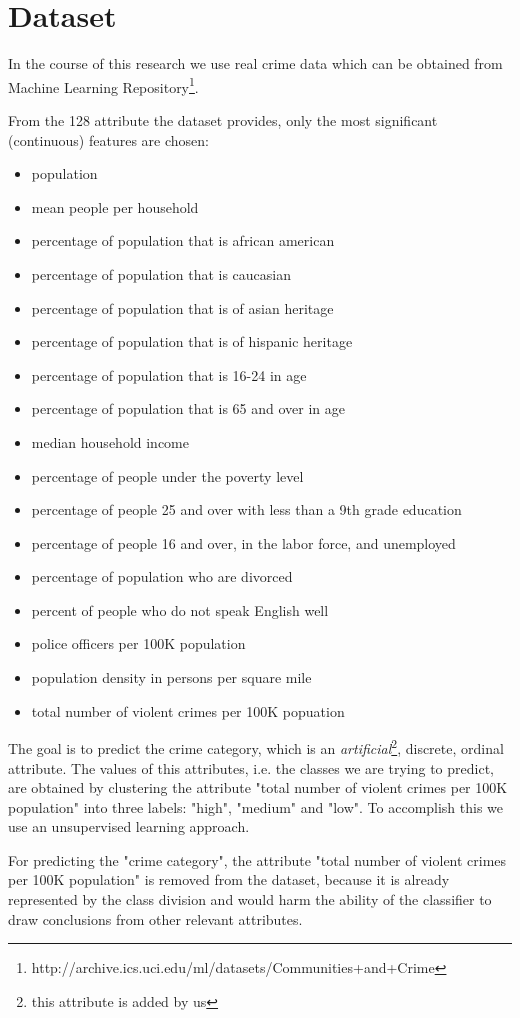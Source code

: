 \section{Dataset}

In the course of this research we use real crime data which can be obtained from Machine Learning Repository\footnote{http://archive.ics.uci.edu/ml/datasets/Communities+and+Crime}.

From the 128 attribute the dataset provides, only the most significant (continuous) features are chosen:

\begin{itemize}
	\setlength{\itemsep}{-2pt}
	\item population 
	\item mean people per household
	\item percentage of population that is african american
	\item percentage of population that is caucasian
	\item percentage of population that is of asian heritage 
	\item percentage of population that is of hispanic heritage
	\item percentage of population that is 16-24 in age
	\item percentage of population that is 65 and over in age 
	\item median household income
	\item percentage of people under the poverty level
	\item percentage of people 25 and over with less than a 9th grade education 
	\item percentage of people 16 and over, in the labor force, and unemployed 
	\item percentage of population who are divorced
	\item percent of people who do not speak English well 
	\item police officers per 100K population
	\item population density in persons per square mile
	\item total number of violent crimes per 100K popuation 
\end{itemize}

The goal is to predict the crime category, which is an \textit{artificial}\footnote{this attribute is added by us}, discrete, ordinal attribute. The values of this attributes, i.e. the classes we are trying to predict,  are obtained by clustering the attribute "total number of violent crimes per 100K population" into three labels: "high", "medium" and "low". To accomplish this we use an unsupervised learning approach. 

For predicting the "crime category", the attribute "total number of violent crimes per 100K population" is removed from the dataset, because it is already represented by the class division and would harm the ability of the classifier to draw conclusions from other relevant attributes.